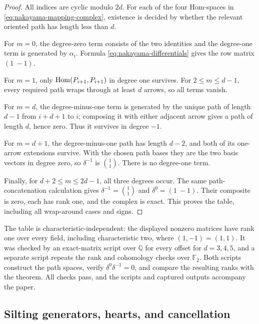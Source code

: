\begin{proof}
All indices are cyclic modulo \(2d\).  For each of the four Hom-spaces in \eqref{eq:nakayama-mapping-complex}, existence is decided by whether the relevant oriented path has length less than \(d\).

For \(m=0\), the degree-zero term consists of the two identities and the degree-one term is generated by \(\alpha_i\).  Formula \eqref{eq:nakayama-differentials} gives the row matrix \((1\ -1)\).

For \(m=1\), only
\(\operatorname{Hom}(P_{i+1},P_{i+1})\) in degree one survives.  For
\(2\le m\le d-1\), every required path wraps through at least \(d\) arrows, so all terms vanish.

For \(m=d\), the degree-minus-one term is generated by the unique path of length \(d-1\) from \(i+d+1\) to \(i\); composing it with either adjacent arrow gives a path of length \(d\), hence zero.  Thus it survives in degree \(-1\).

For \(m=d+1\), the degree-minus-one path has length \(d-2\), and both of its one-arrow extensions survive.  With the chosen path bases they are the two basis vectors in degree zero, so \(\delta^{-1}\) is \(\binom11\).  There is no degree-one term.

Finally, for \(d+2\le m\le2d-1\), all three degrees occur.  The same path-concatenation calculation gives
\(\delta^{-1}=\binom11\) and
\(\delta^0=(1\ -1)\).  Their composite is zero, each has rank one, and the complex is exact.  This proves the table, including all wrap-around cases and signs.
\end{proof}

\begin{remark}\label{rem:nakayama-code}
The table is characteristic-independent: the displayed nonzero matrices have rank one over every field, including characteristic two, where \((1,-1)=(1,1)\).  It was checked by an exact-matrix script over \(\mathbb Q\) for every offset for \(d=3,4,5\), and a separate script repeats the rank and cohomology checks over \(\mathbb F_2\).  Both scripts construct the path spaces, verify \(\delta^0\delta^{-1}=0\), and compare the resulting ranks with the theorem.  All checks pass, and the scripts and captured outputs accompany the paper.
\end{remark}

\subsection{Silting generators, hearts, and cancellation}

